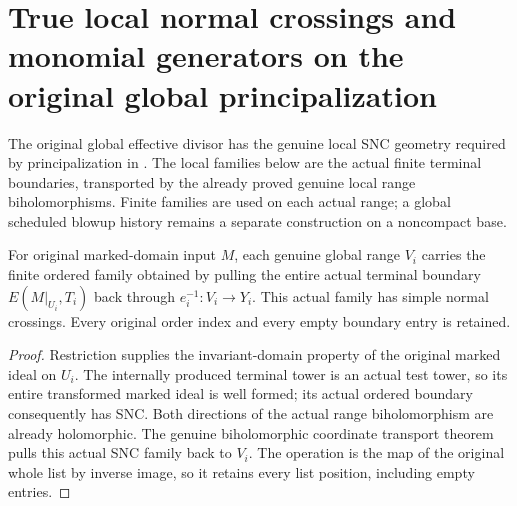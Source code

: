 \section{True local normal crossings and monomial generators on the original global principalization}

The original global effective divisor has the genuine local SNC geometry
required by principalization in \cite{wlodarczyk05-hironaka}.  The local
families below are the actual finite terminal boundaries, transported by
the already proved genuine local range biholomorphisms.  Finite families
are used on each actual range; a global scheduled blowup history remains
a separate construction on a noncompact base.

\begin{theorem}
\label{hir:original-global-terminal-range-boundary-snc}
\leanok
{}
For original marked-domain input $M$, each genuine global range $V_i$
carries the finite ordered family obtained by pulling the entire actual
terminal boundary $E(M|_{U_i},T_i)$ back through $e_i^{-1}:V_i\to Y_i$.
This actual family has simple normal crossings.  Every original order
index and every empty boundary entry is retained.
\end{theorem}
\begin{proof}
Restriction supplies the invariant-domain property of the original marked
ideal on $U_i$.  The internally produced terminal tower is an actual
test tower, so its entire transformed marked ideal is well formed; its
actual ordered boundary consequently has SNC.  Both directions of the
actual range biholomorphism are already holomorphic.  The genuine
biholomorphic coordinate transport theorem pulls this actual SNC family
back to $V_i$.  The operation is the map of the original whole list by
inverse image, so it retains every list position, including empty entries.
\end{proof}

